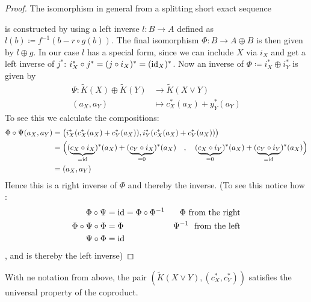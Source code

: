 \begin{proof}
	The isomorphism in general from a splitting short exact sequence 
	\begin{center}
	\end{center}is constructed by using a left inverse $l:B \to A$ defined as $l(b)\coloneq f^{-1}(b-r\circ g(b))$. The final isomorphism $\Phi: B\to A\oplus B$ is then given by $l\oplus g$. In our case $l$ has a special form, since we can include $X$ via $i_X$ and get a left inverse of $j^*$: $i_X^*\circ j^*=(j\circ i_X)^*=(\operatorname{\text{id}}_X)^*$.
	Now an inverse of $\Phi\coloneq i_X^*\oplus i_Y^*$ is given by 
	\begin{align*}
		\Psi: \tilde{K}(X)\oplus \tilde{K}(Y) &\to \tilde{K}(X\vee Y)\\
		(a_X,a_Y)                             &\mapsto c_X^*(a_X)+y_Y^*(a_Y)
	\end{align*}
	To see this we calculate the compositions:
	\begin{align*}
		\Phi\circ \Psi(a_X,a_Y)&=\big( i_X^*(c_X^*(a_X)+c_Y^*(a_X)),i_Y^*(c_X^*(a_X)+c_Y^*(a_X)) \big)\\
		&=\Big( (\underbrace{c_X\circ i_X}_{=\operatorname{\text{id}}})^*(a_X)+(\underbrace{c_Y\circ i_X}_{=0})^*(a_X)\quad , \quad (\underbrace{c_X\circ i_Y}_{=0})^*(a_X)+(\underbrace{c_Y\circ i_Y}_{=\operatorname{\text{id}}})^*(a_X) \Big)\\
		&=(a_X,a_Y)
	\end{align*}
	Hence this is a right inverse of $\Phi$ and thereby the inverse. (To see this notice how :
	\begin{align*}
		\Phi\circ \Psi&=\operatorname{\text{id}}=\Phi\circ \Phi^{-1} &\Phi ~\text{from the right}\\
		\Phi\circ \Psi\circ \Phi &=\Phi & \Psi^{-1}~ \text{ from the left}\\
		\Psi\circ \Phi &=\operatorname{\text{id}}
	\end{align*}, and is thereby the left inverse)
\end{proof}
\begin{cor}
	With ne notation from above, the pair $(\tilde{K}(X\vee Y),(c_X^*,c_Y^*))$ satisfies the universal property of the coproduct. 
\end{cor}
